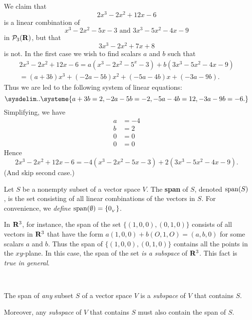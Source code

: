 \begin{example} \label{example 1.4.2}
We claim that
\[
    2x^3 - 2x^2 + 12x - 6
\]
is a linear combination of
\[
    x^3 - 2x^2 - 5x - 3 \text{ and } 3x^3 - 5x^2 - 4x - 9
\]
in \(\mathcal{P}_3(\mathbf{R})\), but that
\[
    3x^3 - 2x^2 + 7x + 8
\]
is not.
In the first case we wish to find scalars \(a\) and \(b\) such that
\begin{align*}
    2x^3 - 2x^2 + 12x - 6 = a(x^3 - 2x^2 - 5^x - 3) + b(3x^3 - 5x^2 - 4x - 9) \\
    = (a + 3b)x^3 + (-2a - 5b)x^2 + (-5a - 4b)x + (-3a - 9b).
\end{align*}
Thus we are led to the following system of linear equations:
\begin{equation*}
\sysdelim..\systeme{
      a + 3b = 2,
    -2a - 5b = -2,
    -5a - 4b = 12,
    -3a - 9b = -6.}
\end{equation*}
Simplifying, we have
\begin{align*}
    a & = -4 \\
    b & = 2 \\
    0 & = 0 \\
    0 & = 0
\end{align*}
Hence
\[
    2x^3 - 2x^2 + 12x - 6 = -4(x^3 - 2x^2 - 5x - 3) + 2(3x^3 - 5x^2 - 4x - 9).
\]
(And skip second case.)
\end{example}

\begin{definition} \label{def 1.4}
Let \(S\) be a nonempty subset of a vector space \(V\).
The \textbf{span} of \(S\), denoted \(\operatorname{span}(S)\), is the set consisting of all linear combinations of the vectors in \(S\).
For convenience, we \emph{define} \(\operatorname{span}(\emptyset) = \{ 0_{_V} \}\).
\end{definition}

In \(\mathbf{R}^3\), for instance, the span of the set \(\{ (1,0,0), (0, 1,0) \}\) consists of all vectors in \(\mathbf{R}^3\) that have the form \(a(1, 0, 0) + b(O, 1, O) = (a, b, 0)\) for some scalars \(a\) and \(b\).
Thus the span of \(\{ (1, 0, 0), (0, 1, 0) \}\) contains all the points in the \(xy\)-plane.
In this case, the span of the set \emph{is a subspace} of \(\mathbf{R}^3\). This fact is \emph{true in general}.

\begin{theorem} \label{thm 1.5}\ 

 The span of \emph{any} subset \(S\) of a vector space \(V\) is a \emph{subspace} of \(V\) that contains \(S\).

 Moreover, any \emph{subspace} of \(V\) that contains \(S\) must also contain the span of \(S\).
\end{theorem}


